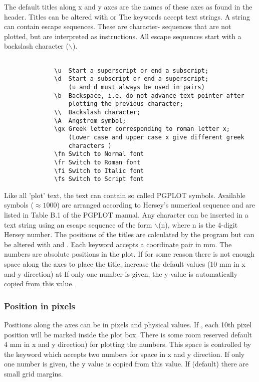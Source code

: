 The default titles along x and y axes are the names of
these axes as found in the header. Titles can be altered
with  or  The keywords accept text strings.
A string can contain escape sequences. These are character-
sequences that are not plotted, but are interpreted as 
instructions. All escape sequences start with a backslash
character ($\backslash$). 
\begin{verbatim}

              \u  Start a superscript or end a subscript;
              \d  Start a subscript or end a superscript;
                  (u and d must always be used in pairs)
              \b  Backspace, i.e. do not advance text pointer after
                  plotting the previous character;
              \\  Backslash character;
              \A  Angstrom symbol;
              \gx Greek letter corresponding to roman letter x;
                  (Lower case and upper case x give different greek
                  characters )
              \fn Switch to Normal font
              \fr Switch to Roman font
              \fi Switch to Italic font
              \fs Switch to Script font
\end{verbatim}
             
Like all 'plot' text, the text can contain so called
PGPLOT symbols. Available symbols ($\approx1000$) are arranged 
according to Hersey's numerical sequence and are listed in 
Table B.1 of the PGPLOT manual. Any character can be 
inserted in a text string using an escape sequence of the 
form $\backslash$(n), where n is the 4-digit Hersey number. 
The positions of the titles are calculated by the program
but can be altered with  and .
Each keyword
accepts a coordinate pair in mm. The numbers are absolute
positions in the plot. If for some reason there is not
enough space along the axes to place the title, increase
the default values (10 mm in x and y direction) at
 If only one number is given, the y value is
automatically copied from this value.
              
             
\subsubsection*{Position in pixels}
              
Positions along the axes can be in pixels and physical
values. If , each 10th pixel position will be  
marked inside the plot box. There is some room reserved
default 4 mm in x and y direction) for plotting the
numbers. This space is controlled by the keyword
 which accepts two numbers for space in x and y 
direction. If only one number is given, the y value is
copied from this value. If  (default)
there are small grid margins.              

